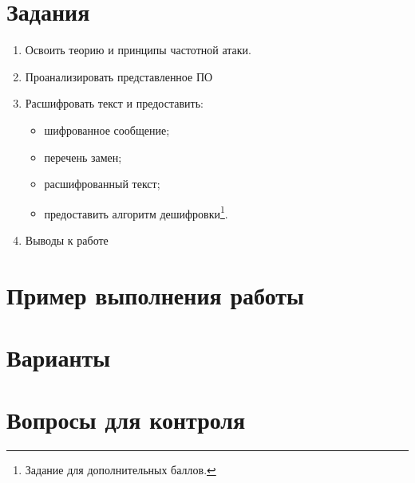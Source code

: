 \section{Задания}\label{sect2_b}
%
\begin{enumerate}
  \item Освоить теорию и принципы частотной атаки.
  \item Проанализировать представленное ПО
  \item Расшифровать текст и предоставить: %
  \begin{itemize}
    \item шифрованное сообщение;
    \item перечень замен;
    \item расшифрованный текст;
    \item предоставить алгоритм дешифровки\footnote{Задание для
        дополнительных баллов.}.
  \end{itemize}
  \item Выводы к работе
\end{enumerate}
\section{Пример выполнения работы}\label{sect2_c}
%
\section{Варианты}\label{sect2_d}
%
\section{Вопросы для контроля}\label{sect2_e}
%
